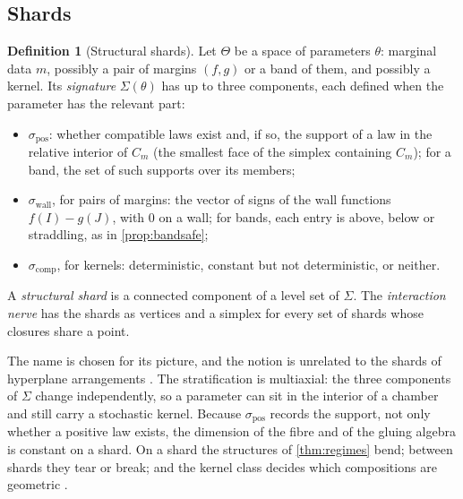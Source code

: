 \documentclass[11pt]{article}
\theoremstyle{definition}
\newtheorem{definition}[theorem]{Definition}
\theoremstyle{remark}
\begin{document}
\subsection{Shards}

\begin{definition}[Structural shards]\label{def:shards}
Let $\Theta$ be a space of parameters $\theta$: marginal data $m$, possibly a pair of margins $(f,g)$ or a band of them, and
possibly a kernel. Its \emph{signature} $\Sigma(\theta)$ has up to three components, each defined when the parameter has the relevant part:
\begin{itemize}[leftmargin=*,nosep]
\item $\sigma_{\mathrm{pos}}$: whether compatible laws exist and, if so, the support of a law in the relative interior of $C_m$ (the
  smallest face of the simplex containing $C_m$); for a band, the set of such supports over its members;
\item $\sigma_{\mathrm{wall}}$, for pairs of margins: the vector of signs of the wall functions $f(I)-g(J)$, with $0$ on a wall; for bands,
  each entry is above, below or straddling, as in \cref{prop:bandsafe};
\item $\sigma_{\mathrm{comp}}$, for kernels: deterministic, constant but not deterministic, or neither.
\end{itemize} A \emph{structural shard}
is a connected component of a level set of $\Sigma$. The \emph{interaction nerve} has the shards as vertices and a simplex for every set
of shards whose closures share a point.
\end{definition}

The name is chosen for its picture, and the notion is unrelated to the shards of hyperplane arrangements \cite{Reading2011}. The
stratification is multiaxial: the three components of $\Sigma$ change independently, so a parameter can sit in the interior of a chamber
and still carry a stochastic kernel. Because $\sigma_{\mathrm{pos}}$ records the support, not only whether a positive law exists, the
dimension of the fibre and of the gluing algebra is constant on a shard. On a shard the structures of \cref{thm:regimes} bend; between shards they tear or break; and
the kernel class decides which compositions are geometric \cite[Thm.~6.1]{Bridges}.
\end{document}
